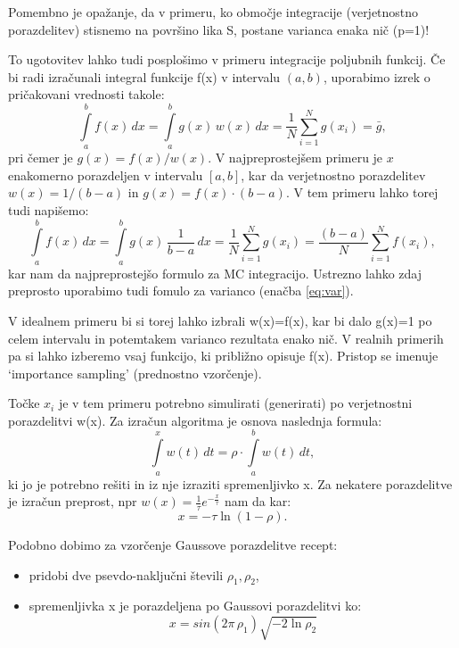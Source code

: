 \documentclass[12pt]{article}
\begin{document}
Pomembno je opažanje, da v primeru, ko
območje integracije (verjetnostno  porazdelitev) stisnemo na površino lika S, postane 
varianca enaka nič (p=1)! 

To ugotovitev lahko
tudi posplošimo v primeru integracije poljubnih funkcij. Če bi
radi izračunali integral funkcije f(x) v intervalu $(a,b)$,
uporabimo izrek o pričakovani  vrednosti takole:
\begin{equation}
\int\limits_{a}^{b} f(x)\,  dx = \int\limits_{a}^{b} g(x)\, w(x)\, dx = \frac{1}{N}
\sum\limits_{i=1}^{N} g(x_i) = \bar{g},
\end{equation}
pri čemer je $g(x)=f(x)/w(x)$. V najpreprostejšem primeru je $x$ enakomerno porazdeljen
v intervalu $[a,b]$, kar da verjetnostno porazdelitev $w(x)=1/(b-a)$ in $g(x)=f(x)\cdot(b-a)$. V tem
primeru lahko torej tudi napišemo:
\begin{equation}
\int\limits_{a}^{b} f(x)\,  dx = \int\limits_{a}^{b} g(x)\, \frac{1}{b-a}\, dx = \frac{1}{N}
\sum\limits_{i=1}^{N} g(x_i) = \frac{(b-a)}{N} \sum\limits_{i=1}^{N} f(x_i),
\end{equation}
kar nam da najpreprostejšo formulo za MC integracijo. Ustrezno lahko zdaj preprosto uporabimo tudi fomulo za varianco (enačba \ref{eq:var}). 

V idealnem primeru bi si torej lahko izbrali w(x)=f(x), kar bi dalo g(x)=1 po celem intervalu in potemtakem
varianco rezultata enako nič. V realnih primerih pa si lahko
izberemo vsaj funkcijo, ki približno opisuje f(x). Pristop se
imenuje `importance sampling' (prednostno vzorčenje).

Točke $x_i$ je v tem primeru potrebno simulirati (generirati) po verjetnostni
porazdelitvi w(x). Za izračun algoritma je osnova naslednja
formula:
\begin{equation}
\int\limits_{a}^{x} w(t)\,  dt = \rho \cdot \int\limits_{a}^{b}  w(t)\, dt,
\end{equation}
ki jo je potrebno rešiti in iz nje izraziti spremenljivko x. Za
nekatere porazdelitve je izračun preprost, npr $w(x)=\frac{1}{\tau}
e^{-\frac{x}{\tau}}$ nam da kar:
\begin{equation}
x=-\tau \ln(1-\rho).
\end{equation}

Podobno dobimo za vzorčenje Gaussove porazdelitve recept:
\begin{itemize}
\item pridobi dve psevdo-naključni števili $\rho_1, \rho_2$,
 \item spremenljivka x je porazdeljena po Gaussovi porazdelitvi ko:
$$ x = sin ( 2\pi\, \rho_1 ) \sqrt{ -2\ln  \rho_2} $$
\end{itemize}
\end{document}
